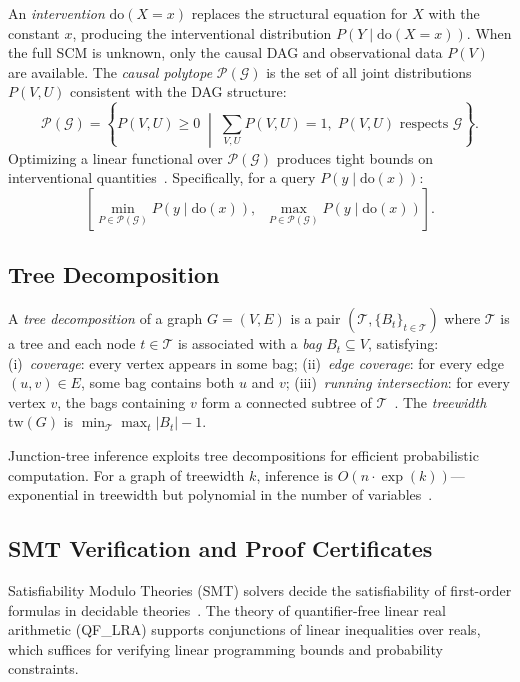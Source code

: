 \documentclass[11pt,a4paper]{article}
\newcommand{\doOp}{\mathrm{do}}
\newcommand{\calG}{\mathcal{G}}
\newcommand{\calP}{\mathcal{P}}
\newcommand{\calT}{\mathcal{T}}
\begin{document}
An \emph{intervention} $\doOp(X = x)$ replaces the structural equation for $X$ with the constant $x$, producing the interventional distribution $P(Y \mid \doOp(X = x))$. When the full SCM is unknown, only the causal DAG and observational data $P(V)$ are available. The \emph{causal polytope} $\calP(\calG)$ is the set of all joint distributions $P(V, U)$ consistent with the DAG structure:
\begin{equation}
\label{eq:polytope}
\calP(\calG) = \left\{ P(V, U) \geq 0 \;\middle|\; \sum_{V,U} P(V,U) = 1, \; P(V,U) \text{ respects } \calG \right\}.
\end{equation}
Optimizing a linear functional over $\calP(\calG)$ produces tight bounds on interventional quantities~\citep{balke1997bounds,tian2002general}. Specifically, for a query $P(y \mid \doOp(x))$:
\begin{equation}
\label{eq:bounds}
\left[\min_{P \in \calP(\calG)} P(y \mid \doOp(x)), \;\; \max_{P \in \calP(\calG)} P(y \mid \doOp(x))\right].
\end{equation}

\subsection{Tree Decomposition}
\label{sec:bg-tree}

A \emph{tree decomposition} of a graph $G = (V,E)$ is a pair $(\calT, \{B_t\}_{t \in \calT})$ where $\calT$ is a tree and each node $t \in \calT$ is associated with a \emph{bag} $B_t \subseteq V$, satisfying: (i)~\emph{coverage}: every vertex appears in some bag; (ii)~\emph{edge coverage}: for every edge $(u,v) \in E$, some bag contains both $u$ and $v$; (iii)~\emph{running intersection}: for every vertex $v$, the bags containing $v$ form a connected subtree of $\calT$~\citep{lauritzen1988local}. The \emph{treewidth} $\mathrm{tw}(G)$ is $\min_{\calT} \max_{t} |B_t| - 1$.

Junction-tree inference exploits tree decompositions for efficient probabilistic computation. For a graph of treewidth $k$, inference is $O(n \cdot \exp(k))$---exponential in treewidth but polynomial in the number of variables~\citep{lauritzen1988local}.

\subsection{SMT Verification and Proof Certificates}
\label{sec:bg-smt}

Satisfiability Modulo Theories (SMT) solvers decide the satisfiability of first-order formulas in decidable theories~\citep{demoura2008z3}. The theory of quantifier-free linear real arithmetic (QF\_LRA) supports conjunctions of linear inequalities over reals, which suffices for verifying linear programming bounds and probability constraints.
\end{document}
